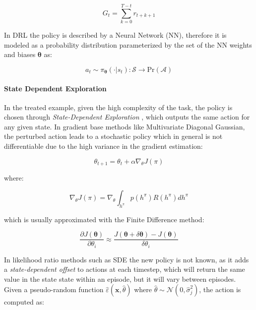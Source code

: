 \begin{equation}
    G _t = \sum ^{T - t} _{k = 0} r _{t+k+1}
\end{equation}


In \ac{DRL} the policy is described by a Neural Network (\ac{NN}), therefore it is modeled as a probability distribution parameterized by the set of the \ac{NN} weights and biases $\boldsymbol{\theta}$ as:

\begin{equation}
    a _t \sim \pi _{\boldsymbol{\theta}}(\cdot | s_t): \mathcal{S} \rightarrow \mathrm{Pr}(\mathcal{A})
\end{equation}

\paragraph{State Dependent Exploration} In the treated example, given the high complexity of the task, the policy is chosen through \textit{State-Dependent Exploration} \citep{daelemans_state-dependent_2008, raffin_smooth_2021}, which outputs the same action for any given state. In gradient base methods like Multivariate Diagonal Gaussian, the perturbed action leads to a stochastic policy which in general is not differentiable due to the high variance in the gradient estimation:

\begin{equation}
    \theta _{t+1} = \theta _t + \alpha \nabla _{\theta} J(\pi)
\end{equation}

where:

\begin{equation}
    \nabla _{\theta} J(\pi) = \nabla _{\theta} \int _{h ^{\pi}} p(h ^{\pi})R(h ^{\pi})dh ^{\pi}
\end{equation}

which is usually approximated with the Finite Difference method:

\begin{equation}
    \label{eqn:finitediff}
    \frac{\partial J(\boldsymbol{\theta})}{\partial \theta _i} \approx \frac{J(\boldsymbol{\theta} + \delta \boldsymbol{\theta}) - J(\boldsymbol{\theta})}{\delta \theta _i}
\end{equation}

In likelihood ratio methods such as \ac{SDE} the new policy is not known, as it adds a \textit{state-dependent offset} to actions at each timestep, which will return the same value in the state state within an episode, but it will vary between episodes. Given a pseudo-random function $\hat{\varepsilon}(\mathbf{x}, \hat{\theta})$ where $\hat{\theta} \sim \mathcal{N}(0, \hat{\sigma} _j ^2)$, the action is computed as:

